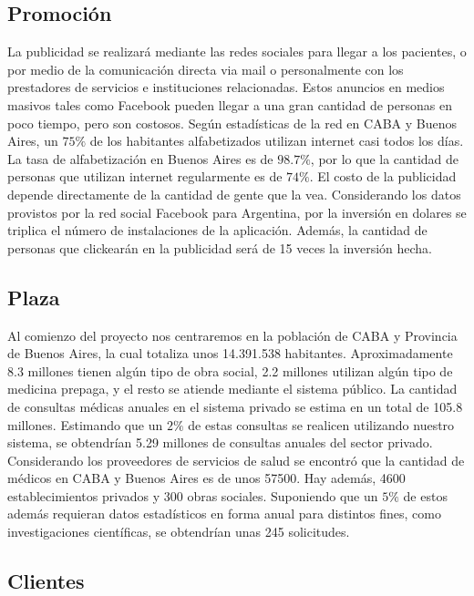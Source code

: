 \documentclass[a4paper,10pt]{article}
\begin{document}
\subsection{Promoción}

La publicidad se realizará mediante las redes sociales para llegar a los pacientes, o por medio de la comunicación directa via mail o personalmente con los prestadores de servicios e instituciones relacionadas.
Estos anuncios en medios masivos tales como Facebook pueden llegar a una gran cantidad de personas en poco tiempo, pero son costosos. Según estadísticas de la red en CABA y Buenos Aires, un $75\%$ de los habitantes alfabetizados utilizan internet casi todos los días. La tasa de alfabetización en Buenos Aires es de $98.7\%$, por lo que la cantidad de personas que utilizan internet regularmente es de $74\%$. El costo de la publicidad depende directamente de la cantidad de gente que la vea. Considerando los datos provistos por la red social Facebook para Argentina, por la inversión en dolares se triplica el número de instalaciones de la aplicación. Además, la cantidad de personas que clickearán en la publicidad será de 15 veces la inversión hecha.

\subsection{Plaza}

Al comienzo del proyecto nos centraremos en la población de CABA y Provincia de Buenos Aires, la cual totaliza unos 14.391.538 habitantes. Aproximadamente 8.3 millones tienen algún tipo de obra social, 2.2 millones utilizan algún tipo de medicina prepaga, y el resto se atiende mediante el sistema público. La cantidad de consultas médicas anuales en el sistema privado se estima en un total de 105.8 millones. 
Estimando que un $2\%$ de estas consultas se realicen utilizando nuestro sistema, se obtendrían 5.29 millones de consultas anuales del sector privado. 
Considerando los proveedores de servicios de salud se encontró que la cantidad de médicos en CABA y Buenos Aires es de unos 57500. Hay además, 4600 establecimientos privados y 300 obras sociales. Suponiendo que un $5\%$ de estos además requieran datos estadísticos en forma anual para distintos fines, como investigaciones científicas, se obtendrían unas 245 solicitudes.

\subsection{Clientes}
\end{document}
